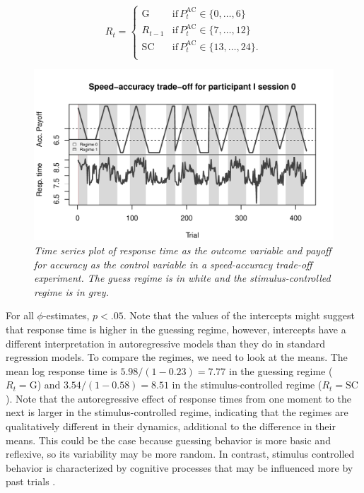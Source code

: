 \documentclass{article}
\begin{document}
\begin{equation} 
R_t = \begin{cases}
\mathrm{G} & \mathrm{if} \, P^{\mathrm{AC}}_{t} \in \{0, \dots, 6\} \\
R_{t-1} & \mathrm{if} \, P^{\mathrm{AC}}_{t} \in \{7, \dots, 12\} \\
\mathrm{SC} & \mathrm{if} \, P^{\mathrm{AC}}_{t} \in \{13, \dots, 24\}. \\
\end{cases}
\end{equation}

\begin{figure}
\begin{center}
\includegraphics[scale=.7]{SAT_plot_I0}
\caption{\textit{Time series plot of response time as the outcome variable and payoff for accuracy as the control variable in a speed-accuracy trade-off experiment. The guess regime is in white and the stimulus-controlled regime is in grey.}}
\label{fig:ts_plot_SAT}
\end{center}
\end{figure}

For all $\phi$-estimates, $p < .05$.
Note that the values of the intercepts might suggest that response time is higher in the guessing regime, however, intercepts have a different interpretation in autoregressive models than they do in standard regression models.
To compare the regimes, we need to look at the means.
The mean log response time is $5.98/(1 - 0.23) = 7.77$ in the guessing regime ($R_t = \mathrm{G}$) and $3.54/(1 - 0.58) = 8.51$ in the stimulus-controlled regime ($R_t = \mathrm{SC}$). 
Note that the autoregressive effect of response times from one moment to the next is larger in the stimulus-controlled regime, indicating that the regimes are qualitatively different in their dynamics, additional to the difference in their means. This could be the case because guessing behavior is more basic and reflexive, so its variability may be more random. In contrast, stimulus controlled behavior is characterized by cognitive processes that may be influenced more by past trials \citep{RT_autocorrelation}.
\end{document}
